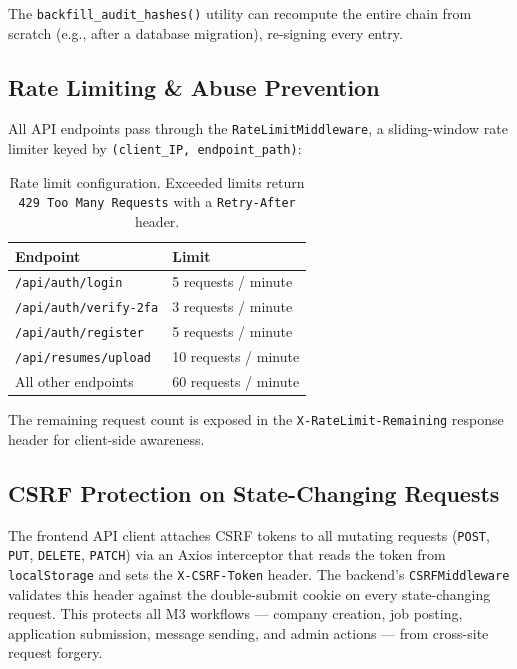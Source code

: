 The \texttt{backfill\_audit\_hashes()} utility can recompute the entire chain from scratch (e.g., after a database migration), re-signing every entry.

\subsection{Rate Limiting \& Abuse Prevention}

All API endpoints pass through the \texttt{RateLimitMiddleware}, a sliding-window rate limiter keyed by \texttt{(client\_IP, endpoint\_path)}:

\begin{table}[H]
\centering
\small
\begin{tabular}{p{5cm} p{4cm}}
    \toprule
    \textbf{Endpoint} & \textbf{Limit} \\
    \midrule
    \texttt{/api/auth/login} & 5 requests / minute \\
    \texttt{/api/auth/verify-2fa} & 3 requests / minute \\
    \texttt{/api/auth/register} & 5 requests / minute \\
    \texttt{/api/resumes/upload} & 10 requests / minute \\
    All other endpoints & 60 requests / minute \\
    \bottomrule
\end{tabular}
\caption{Rate limit configuration. Exceeded limits return \texttt{429 Too Many Requests} with a \texttt{Retry-After} header.}
\end{table}

The remaining request count is exposed in the \texttt{X-RateLimit-Remaining} response header for client-side awareness.

\subsection{CSRF Protection on State-Changing Requests}

The frontend API client attaches CSRF tokens to all mutating requests (\texttt{POST}, \texttt{PUT}, \texttt{DELETE}, \texttt{PATCH}) via an Axios interceptor that reads the token from \texttt{localStorage} and sets the \texttt{X-CSRF-Token} header. The backend's \texttt{CSRFMiddleware} validates this header against the double-submit cookie on every state-changing request. This protects all M3 workflows — company creation, job posting, application submission, message sending, and admin actions — from cross-site request forgery.

